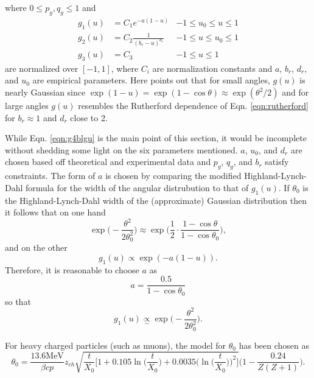 %
where $0\leq p_g,q_g\leq 1$ and
%
\begin{align*}\nonumber
g_1(u)&=C_1e^{-a(1-u)} & -1\le u_0\le u\le 1\\
g_2(u)&=C_2\frac{1}{(b_r-u)^{d_r}} & -1\le u\le u_0\le 1\\
g_3(u)&=C_3 & -1\le u \le 1
\end{align*}
%
are normalized over $[-1,1]$, where $C_i$ are normalization constants and $a$, $b_r$, $d_r$, and $u_0$ are empirical parameters. Here \cite{geant4} points out that for small angles, $g(u)$ is nearly Gaussian since $\exp{(1-u)}=\exp{(1-\cos\theta)}\approx\exp{(\theta^2/2)}$ and for large angles $g(u)$ resembles the Rutherford dependence of Eqn. \ref{eqn:rutherford} for $b_r\approx 1$ and $d_r$ close to 2.

While Eqn. \ref{eqn:g4blgu} is the main point of this section, it would be incomplete without shedding some light on the six parameters mentioned. $a$, $u_0$, and $d_r$ are chosen based off theoretical and experimental data and $p_g$, $q_g$, and $b_r$ satisfy constraints. The form of $a$ is chosen by comparing the modified Highland-Lynch-Dahl formula for the width of the angular distrubution to that of $g_1(u)$. If $\theta_0$ is the Highland-Lynch-Dahl width of the (approximate) Gaussian distribution then it follows that on one hand
%
\begin{equation}\nonumber
\exp{\Big(-\frac{\theta^2}{2\theta_0^2}\Big)} \approx \exp\Big(\frac{1}{2}\cdot\frac{1-\cos\theta}{1-\cos\theta_0}\Big),
\end{equation}
%
and on the other
%
\begin{equation}\nonumber
g_1(u)\propto \exp{(-a(1-u))}.
\end{equation}
%
Therefore, it is reasonable to choose $a$ as
%
\begin{equation}
a=\frac{0.5}{1-\cos\theta_0}
\label{eqn:geanta}
\end{equation}
%
so that
%
\begin{equation}\nonumber
g_1(u) \underset{\sim}{\propto}\exp{\Big(-\frac{\theta^2}{2\theta_0^2}\Big)}.
\end{equation}
%

 For heavy charged particles (such as muons), the model for $\theta_0$ has been chosen as
%
\begin{equation}\nonumber
\theta_0=\frac{13.6 \text{MeV}}{\beta c p}z_{ch}\sqrt{\frac{t}{X_0}\Big[ 1+0.105\ln\Big(\frac{t}{X_0}\Big)+0.0035\Big(\ln\Big(\frac{t}{X_0}\Big)\Big)^2 \Big]}\Big(1-\frac{0.24}{Z(Z+1)}\Big).
\end{equation}

